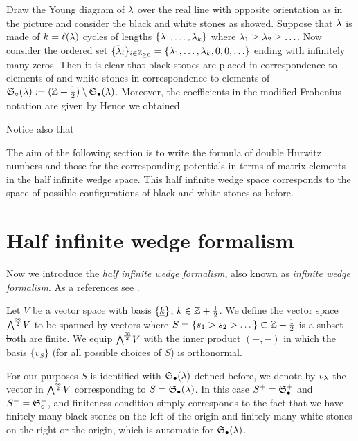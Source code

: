 \documentclass[../main/main.tex]{subfiles}
\begin{document}
Draw the Young diagram of $\lambda$ over the real line with opposite orientation as in the picture  and consider the black and white stones as showed. Suppose that $\lambda$ is made of $k=\ell(\lambda)$ cycles of lengths $\{\lambda_1,\ldots,\lambda_k\}$ where $\lambda_1\geq\lambda_2\geq\ldots$. Now consider the ordered set $\{\tilde {\lambda}_i\}_{i\in\mathbb Z_{\geq0}}=\{\lambda_1,\ldots,\lambda_k,0,0,\ldots\}$ ending with infinitely many zeros. Then it is clear that black stones are placed in correspondence to elements of 
and white stones in correspondence to elements of $\mathfrak S_\circ(\lambda):=(\mathbb Z+\frac12)\setminus\mathfrak S_\bullet(\lambda)$. Moreover, the coefficients in the modified Frobenius notation are given by
Hence we obtained

Notice also that

The aim of the following section is to write the formula of double Hurwitz numbers and those for the corresponding potentials in terms of matrix elements in the half infinite wedge space. This half infinite wedge space corresponds to the space of possible configurations of black and white stones as before.

\section{Half infinite wedge formalism}

Now we introduce the \emph{half infinite wedge formalism}, also known as \emph{infinite wedge formalism}. As a references see \cite{MJD,O2,J}.

Let $V$ be a vector space with basis $\{\underline{k}\}$, $k\in\mathbb Z+\frac12$. We define the vector space $\bigwedge^{\!\frac\infty2}\!V$ to be spanned by vectors
where $S=\{s_1>s_2>\dots\}\subset\mathbb Z+\frac12$ is a subset \st both
are finite. We equip $\bigwedge^{\!\frac\infty2}\!V$ with the inner product $(-,-)$ in which the basis $\{v_S\}$ (for all possible choices of $S$) is orthonormal. 

For our purposes $S$ is identified with $\mathfrak S_\bullet(\lambda)$ defined before, we denote by $v_\lambda$ the vector in $\bigwedge^{\!\frac\infty2}\!V$ corresponding to $S=\mathfrak S_\bullet(\lambda)$. In this case $S^+=\mathfrak S_\bullet^+$ and $S^-=\mathfrak S_\circ^-$, and finiteness condition simply corresponds to the fact that we have finitely many black stones on the left of the origin and finitely many white stones on the right or the origin, which is automatic for $\mathfrak S_\bullet(\lambda)$. 
\end{document}
